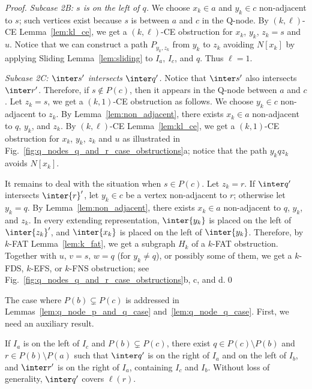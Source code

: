 \begin{proof}
\emph{Subcase 2B: $s$ is on the left of $q$.}
We choose $x_k \in a$ and $y_k \in c$ non-adjacent to $s$; such vertices exist because $s$ is
between $a$ and $c$ in the Q-node. By $(k,\ell)$-CE Lemma~\ref{lem:kl_ce}, we get a $(k,\ell)$-CE
obstruction for $x_k$, $y_k$, $z_k = s$ and $u$. Notice that we can construct a path
$P_{y_k,z_k}$ from $y_k$ to $z_k$ avoiding $N[x_k]$ by applying Sliding Lemma~\ref{lem:sliding} to
$I_a$, $I_c$, and $q$. Thus $\ell = 1$.

\emph{Subcase 2C: $\inter s'$ intersects $\inter q'$.}
Notice that $\inter s'$ also intersects $\inter r'$. Therefore, if $s \notin P(c)$, then it appears
in the Q-node between $a$ and $c$. Let $z_k = s$, we get a $(k,1)$-CE obstruction as follows.  We
choose $y_k \in c$ non-adjacent to $z_k$.  By Lemma~\ref{lem:non_adjacent}, there exists $x_k \in a$
non-adjacent to $q$, $y_k$, and $z_k$. By $(k,\ell)$-CE Lemma~\ref{lem:kl_ce}, we get a $(k,1)$-CE
obstruction for $x_k$, $y_k$, $z_k$ and $u$ as illustrated in
Fig.~\ref{fig:q_nodes_q_and_r_case_obstructions}a; notice that the path $y_kqz_k$ avoids $N[x_k]$.

It remains to deal with the situation when $s \in P(c)$.  Let $z_k = r$. If $\inter q'$ intersects
$\inter {r}'$, let $y_k \in c$ be a vertex non-adjacent to $r$; otherwise let $y_k = q$. By
Lemma~\ref{lem:non_adjacent}, there exists $x_k \in a$ non-adjacent to $q$, $y_k$, and $z_k$.  In
every extending representation, $\inter{y_k}$ is placed on the left of $\inter{z_k}'$, and
$\inter{x_k}$ is placed on the left of $\inter{y_k}$.  Therefore, by $k$-FAT Lemma~\ref{lem:k_fat},
we get a subgraph $H_k$ of a $k$-FAT obstruction.  Together with $u$, $v = s$, $w = q$ (for $y_k \ne
q$), or possibly some of them, we get a $k$-FDS, $k$-EFS, or $k$-FNS obstruction; see
Fig.~\ref{fig:q_nodes_q_and_r_case_obstructions}b, c, and d.\qed
\end{proof}

The case where $P(b) \subsetneq P(c)$ is addressed in Lemmas~\ref{lem:q_node_p_and_q_case}
and~\ref{lem:q_node_q_case}. First, we need an auxiliary result.

\begin{lemma} \label{lem:q_node_q_case_wlog}
If $I_a$ is on the left of $I_c$ and $P(b) \subsetneq P(c)$, there exist $q \in P(c) \setminus
P(b)$ and $r \in P(b) \setminus P(a)$ such that $\inter q'$ is on the right of $I_a$ and on the left
of $I_b$, and $\inter r'$ is on the right of $I_a$, containing $I_c$ and $I_b$.  Without loss of
generality, $\inter q'$ covers $\ell(r)$.
\end{lemma}

